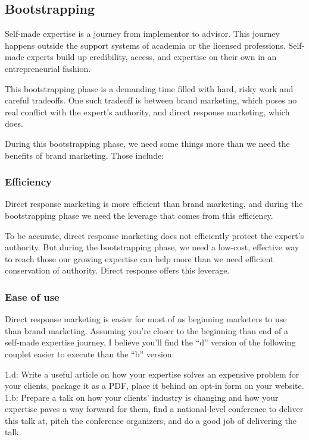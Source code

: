 \documentclass[13pt,]{tufte-handout}
\begin{document}
\hypertarget{bootstrapping-1}{%
\subsection{Bootstrapping}\label{bootstrapping-1}}

Self-made expertise is a journey from implementor to advisor. This
journey happens outside the support systems of academia or the licensed
professions. Self-made experts build up credibility, access, and
expertise on their own in an entrepreneurial fashion.

This bootstrapping phase is a demanding time filled with hard, risky
work and careful tradeoffs. One such tradeoff is between brand
marketing, which poses no real conflict with the expert's authority, and
direct response marketing, which does.

During this bootstrapping phase, we need some things more than we need
the benefits of brand marketing. Those include:

\hypertarget{efficiency}{%
\subsubsection{Efficiency}\label{efficiency}}

Direct response marketing is more efficient than brand marketing, and
during the bootstrapping phase we need the leverage that comes from this
efficiency.

To be accurate, direct response marketing does not efficiently protect
the expert's authority. But during the bootstrapping phase, we need a
low-cost, effective way to reach those our growing expertise can help
more than we need efficient conservation of authority. Direct response
offers this leverage.

\hypertarget{ease-of-use}{%
\subsubsection{Ease of use}\label{ease-of-use}}

Direct response marketing is easier for most of us beginning marketers
to use than brand marketing. Assuming you're closer to the beginning
than end of a self-made expertise journey, I believe you'll find the
``d'' version of the following couplet easier to execute than the ``b''
version:

1.d: Write a useful article on how your expertise solves an expensive
problem for your clients, package it as a PDF, place it behind an opt-in
form on your website. 1.b: Prepare a talk on how your clients' industry
is changing and how your expertise paves a way forward for them, find a
national-level conference to deliver this talk at, pitch the conference
organizers, and do a good job of delivering the talk.
\end{document}
